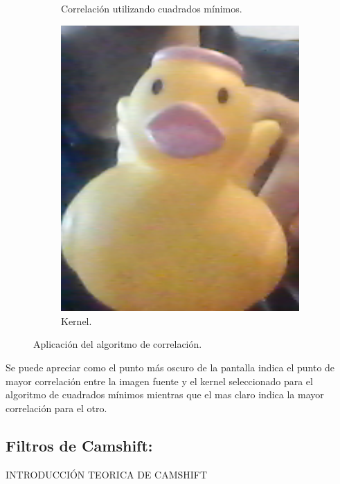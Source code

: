 \begin{figure}[H]
\begin{subfigure}{.4\textwidth}
		\caption{Correlación utilizando cuadrados mínimos.}
		\label{fig:sqdiff}
	\end{subfigure}
	\begin{subfigure}{.1\textwidth}
		\centering
		\includegraphics[width=1.2\textwidth]{Imagenes/kernel.png}
		\caption{Kernel.}
		\label{fig:kernel}
	\end{subfigure}
	\caption{Aplicación del algoritmo de correlación.}
	\label{fig:corrtest}
\end{figure}
Se puede apreciar como el punto más oscuro de la pantalla indica el punto de mayor correlación entre la imagen fuente y el kernel seleccionado para el algoritmo de cuadrados mínimos mientras que el mas claro indica la mayor correlación para el otro. 
\subsection{Filtros de Camshift:}
\begin{Huge}
INTRODUCCIÓN TEORICA DE CAMSHIFT
\end{Huge}
